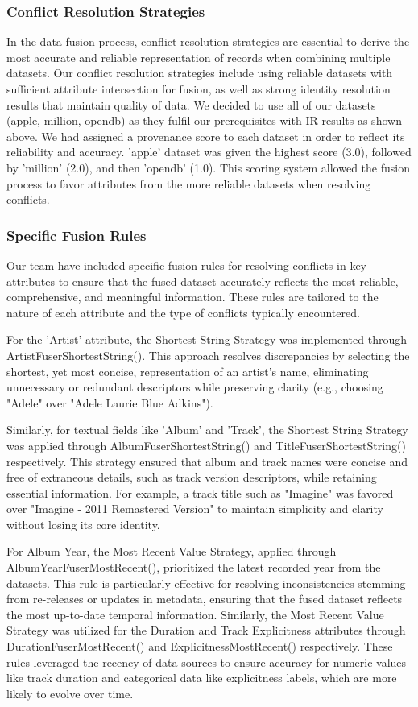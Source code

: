 \documentclass[runningheads]{llncs}
\begin{document}
\subsubsection{Conflict Resolution Strategies}
In the data fusion process, conflict resolution strategies are essential to derive the most accurate and reliable representation of records when combining multiple datasets. Our conflict resolution strategies include using reliable datasets with sufficient attribute intersection for fusion, as well as strong identity resolution results that maintain quality of data. We decided to use all of our datasets (apple, million, opendb) as they fulfil our prerequisites with IR results as shown above. We had assigned a provenance score to each dataset in order to reflect its reliability and accuracy. 'apple' dataset was given the highest score (3.0), followed by 'million' (2.0), and then 'opendb' (1.0). This scoring system allowed the fusion process to favor attributes from the more reliable datasets when resolving conflicts.

\subsubsection{Specific Fusion Rules}
Our team have included specific fusion rules for resolving conflicts in key attributes to ensure that the fused dataset accurately reflects the most reliable, comprehensive, and meaningful information. These rules are tailored to the nature of each attribute and the type of conflicts typically encountered.

For the 'Artist' attribute, the Shortest String Strategy was implemented through ArtistFuserShortestString(). This approach resolves discrepancies by selecting the shortest, yet most concise, representation of an artist's name, eliminating unnecessary or redundant descriptors while preserving clarity (e.g., choosing "Adele" over "Adele Laurie Blue Adkins").

Similarly, for textual fields like 'Album' and 'Track', the Shortest String Strategy was applied through AlbumFuserShortestString() and TitleFuserShortestString() respectively. This strategy ensured that album and track names were concise and free of extraneous details, such as track version descriptors, while retaining essential information. For example, a track title such as "Imagine" was favored over "Imagine - 2011 Remastered Version" to maintain simplicity and clarity without losing its core identity.

For Album Year, the Most Recent Value Strategy, applied through AlbumYearFuserMostRecent(), prioritized the latest recorded year from the datasets. This rule is particularly effective for resolving inconsistencies stemming from re-releases or updates in metadata, ensuring that the fused dataset reflects the most up-to-date temporal information. Similarly, the Most Recent Value Strategy was utilized for the Duration and Track Explicitness attributes through DurationFuserMostRecent() and ExplicitnessMostRecent() respectively. These rules leveraged the recency of data sources to ensure accuracy for numeric values like track duration and categorical data like explicitness labels, which are more likely to evolve over time.
\end{document}

